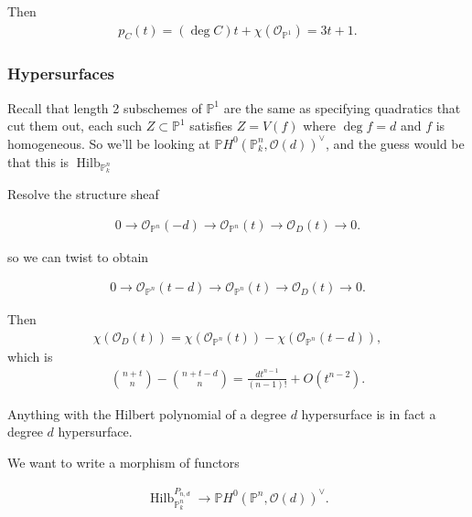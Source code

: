 Then
\begin{align*}
p_C(t) = (\deg C)t + \chi({\mathcal{O}}_{{\mathbb{P}}^1}) = 3t + 1
.\end{align*}

\hypertarget{hypersurfaces}{%
\subsubsection{Hypersurfaces}\label{hypersurfaces}}

Recall that length 2 subschemes of \({\mathbb{P}}^1\) are the same as
specifying quadratics that cut them out, each such
\(Z \subset {\mathbb{P}}^1\) satisfies \(Z = V(f)\) where \(\deg f = d\)
and \(f\) is homogeneous. So we'll be looking at
\({\mathbb{P}}H^0({\mathbb{P}}^n_k, {\mathcal{O}}(d))^\vee\), and the
guess would be that this is \(\operatorname{Hilb}_{{\mathbb{P}}^n_k}\)

Resolve the structure sheaf

\begin{align*} 0 \to {\mathcal{O}}_{{\mathbb{P}}^n}(-d) \to {\mathcal{O}}_{{\mathbb{P}}^n}(t) \to {\mathcal{O}}_D(t) \to 0 .\end{align*}

so we can twist to obtain

\begin{align*} 0 \to {\mathcal{O}}_{{\mathbb{P}}^n}(t-d) \to {\mathcal{O}}_{{\mathbb{P}}^n}(t) \to {\mathcal{O}}_D(t) \to 0 .\end{align*}

Then
\begin{align*}
\chi({\mathcal{O}}_D(t)) = \chi({\mathcal{O}}_{{\mathbb{P}}^n}(t)) - \chi({\mathcal{O}}_{{\mathbb{P}}^n}(t-d))
,\end{align*}
which is
\begin{align*}
{n+t \choose n} - {n+t-d \choose n} = \frac{dt^{n-1}}{(n-1)!} + O(t^{n-2})
.\end{align*}

\begin{description}
\tightlist
\item[Lemma]
Anything with the Hilbert polynomial of a degree \(d\) hypersurface is
in fact a degree \(d\) hypersurface.
\end{description}

We want to write a morphism of functors

\begin{align*} \operatorname{Hilb}_{{\mathbb{P}}^n_k}^{P_{n, d}} \to {\mathbb{P}}H^0 ({\mathbb{P}}^n, {\mathcal{O}}(d) )^\vee .\end{align*}

